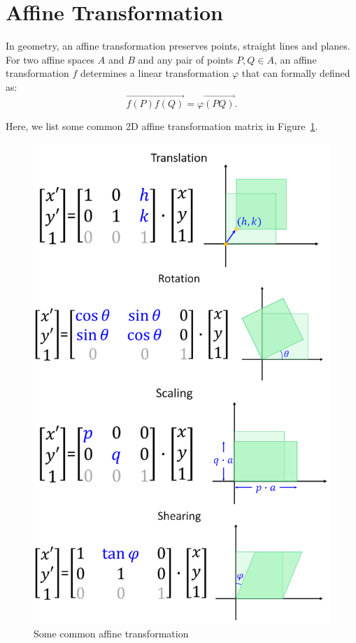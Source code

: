 \section{Affine Transformation}
In geometry, an affine transformation preserves points, straight lines and planes.
For two affine spaces $A$ and $B$ and any pair of points $P, Q \in A$,
an affine transformation $f$ determines a linear transformation $\varphi$ that can formally defined as:
\begin{displaymath}
\overrightarrow{f(P)f(Q)} = \varphi \overrightarrow{(PQ)}.
\end{displaymath}

Here, we list some common 2D affine transformation matrix in Figure~\ref{fig:Affine_simple}.

\begin{figure}
\centering
\includegraphics[width=\textwidth]{Affine_simple}
\caption{Some common affine transformation}\label{fig:Affine_simple}
\end{figure}

